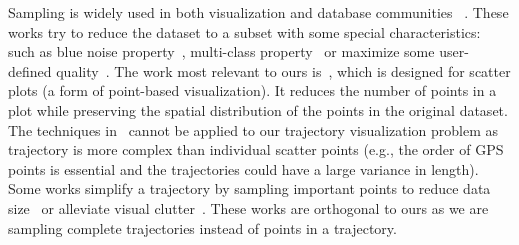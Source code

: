  Sampling is widely used in both visualization and database communities ~\cite{battle2013dynamic,rapp2019void,chen2014visual,yu2020turbocharging,park2016visualization,qin2020making,DBLP:conf/sigmod/DingHCC016,DBLP:journals/pvldb/KimBPIMR15}. These works try to reduce the dataset to a subset with some special characteristics: such as blue noise property~\cite{rapp2019void}, multi-class property~\cite{chen2014visual} or maximize some user-defined quality~\cite{yu2020turbocharging}. The work most relevant to ours is~\cite{park2016visualization}, which is designed for scatter plots (a form of point-based visualization). It reduces the number of points in a plot while preserving the spatial distribution of the points in the original dataset. The techniques in~\cite{park2016visualization} cannot be applied to our trajectory visualization problem
as trajectory is more complex than individual scatter points (e.g., the order of GPS points is essential and the trajectories could have a large variance in length). Some works simplify a trajectory by sampling important points to reduce data size~\cite{zhang2018trajectory,2018arXiv180303550V} or alleviate visual clutter~\cite{borcan2012improving, 6851202}. These works are orthogonal to ours as we are sampling complete trajectories instead of points in a trajectory.






